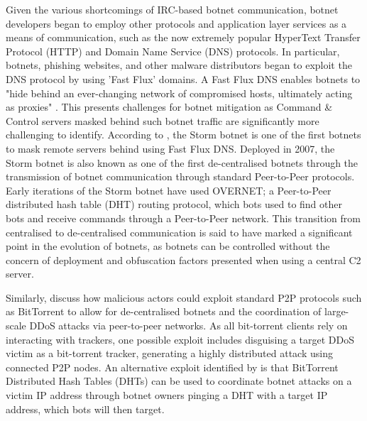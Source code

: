 Given the various shortcomings of IRC-based botnet communication, botnet developers began to employ other protocols and application layer services as a means of communication, such as the now extremely popular HyperText Transfer Protocol (HTTP) and Domain Name Service (DNS) protocols. In particular, botnets, phishing websites, and other malware distributors began to exploit the DNS protocol by using 'Fast Flux' domains. A Fast Flux DNS enables botnets to "hide behind an ever-changing network of compromised hosts, ultimately acting as proxies" \citep{Morton2017}. This presents challenges for botnet mitigation as Command \& Control servers masked behind such botnet traffic are significantly more challenging to identify. According to \citet{Morton2017}, the Storm botnet is one of the first botnets to mask remote servers behind using Fast Flux DNS. Deployed in 2007, the Storm botnet is also known as one of the first de-centralised botnets through the transmission of botnet communication through standard Peer-to-Peer protocols. Early iterations of the Storm botnet have used OVERNET; a Peer-to-Peer distributed hash table (DHT) routing protocol, which bots used to find other bots and receive commands through a Peer-to-Peer network. \citep{Holz2008} This transition from centralised to de-centralised communication is said to have marked a significant point in the evolution of botnets, as botnets can be controlled without the concern of deployment and obfuscation factors presented when using a central C2 server.

Similarly, \citet{ElDefrawy2007} discuss how malicious actors could exploit standard P2P protocols such as BitTorrent to allow for de-centralised botnets and the coordination of large-scale DDoS attacks via peer-to-peer networks. As all bit-torrent clients rely on interacting with trackers, one possible exploit includes disguising a target DDoS victim as a bit-torrent tracker, generating a highly distributed attack using connected P2P nodes. An alternative exploit identified by \citet{ElDefrawy2007} is that BitTorrent Distributed Hash Tables (DHTs) can be used to coordinate botnet attacks on a victim IP address through botnet owners pinging a DHT with a target IP address, which bots will then target. 

